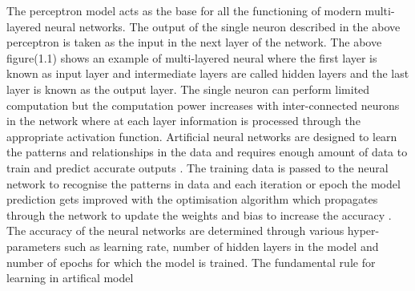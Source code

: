 The perceptron model acts as the base for all the functioning of modern multi-layered neural networks.
The output of the single neuron described in the above perceptron is taken as the input in the next layer of the network. The above figure(1.1) shows an example of multi-layered neural where the first layer is known 
as input layer and intermediate layers are called hidden layers and the last layer is known as the output layer.
The single neuron can perform limited computation but the computation power increases with inter-connected
neurons in the network \citep{AGATONOVICKUSTRIN2000717} where at each layer information is processed through the appropriate 
activation function. Artificial neural networks are designed to learn the patterns and relationships in the data and requires enough amount of data to train and predict accurate outputs \citep{AGATONOVICKUSTRIN2000717}.
The training data is passed to the neural network to recognise the patterns in data and each iteration or epoch 
the model prediction gets improved with the optimisation algorithm which propagates through the network to 
update the weights and bias to increase the accuracy \citep{AGATONOVICKUSTRIN2000717}. The accuracy of the neural networks are determined through various hyper-parameters such as learning rate, number of hidden layers in the model and 
number of epochs for which the model is trained. The fundamental rule for learning in artifical model 



